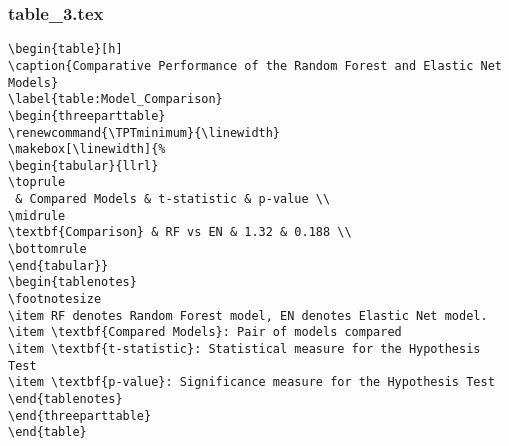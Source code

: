 \documentclass[11pt]{article}
\begin{document}
\subsubsection*{table\_3.tex}

\begin{Verbatim}[tabsize=4]
\begin{table}[h]
\caption{Comparative Performance of the Random Forest and Elastic Net Models}
\label{table:Model_Comparison}
\begin{threeparttable}
\renewcommand{\TPTminimum}{\linewidth}
\makebox[\linewidth]{%
\begin{tabular}{llrl}
\toprule
 & Compared Models & t-statistic & p-value \\
\midrule
\textbf{Comparison} & RF vs EN & 1.32 & 0.188 \\
\bottomrule
\end{tabular}}
\begin{tablenotes}
\footnotesize
\item RF denotes Random Forest model, EN denotes Elastic Net model.
\item \textbf{Compared Models}: Pair of models compared
\item \textbf{t-statistic}: Statistical measure for the Hypothesis Test
\item \textbf{p-value}: Significance measure for the Hypothesis Test
\end{tablenotes}
\end{threeparttable}
\end{table}

\end{Verbatim}
\end{document}
